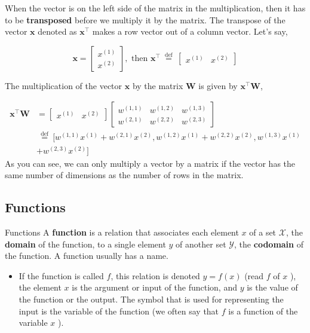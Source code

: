 \documentclass[9pt,dvipsnames]{beamer}
\begin{document}
\begin{frame}
	 When the vector is on the left side of the matrix in the multiplication, then it has to be \textbf{transposed} before we multiply it by the matrix. The transpose of the vector $\mathbf{x}$ denoted as $\mathbf{x}^{\top}$ makes a row vector out of a column vector. Let's say,
	
	$$
	\mathbf{x}=\left[\begin{array}{l}
		x^{(1)} \\
		x^{(2)}
	\end{array}\right], \text { then } \mathbf{x}^{\top} \stackrel{\text { def }}{=}\left[\begin{array}{ll}
		x^{(1)} & x^{(2)}
	\end{array}\right]
	$$
	
	The multiplication of the vector $\mathbf{x}$ by the matrix $\mathbf{W}$ is given by $\mathbf{x}^{\top} \mathbf{W}$,
	
	\begin{equation*}
			\begin{aligned}
			\mathbf{x}^{\top} \mathbf{W} & =\left[\begin{array}{ll}
				x^{(1)} & x^{(2)}
			\end{array}\right]\left[\begin{array}{lll}
				w^{(1,1)} & w^{(1,2)} & w^{(1,3)} \\
				w^{(2,1)} & w^{(2,2)} & w^{(2,3)}
			\end{array}\right] \\
			& \stackrel{\text { def }}{=}[w^{(1,1)} x^{(1)}+w^{(2,1)} x^{(2)}, w^{(1,2)} x^{(1)}+w^{(2,2)} x^{(2)}, w^{(1,3)} x^{(1)} \\
			& +w^{(2,3)} x^{(2)}]
		\end{aligned}
	\end{equation*}
	As you can see, we can only multiply a vector by a matrix if the vector has the same number of dimensions as the number of rows in the matrix.
\end{frame}

\subsection{Functions}
\begin{frame}{Functions}
	A \textbf{function} is a relation that associates each element $x$ of a set $\mathcal{X}$, the \textbf{domain} of the function, to a single element $y$ of another set $\mathcal{Y}$, the \textbf{codomain} of the function. A function usually has a name. 
	\begin{itemize}
		\item 	If the function is called $f$, this relation is denoted $y=f(x)$ (read $f$ of $x$ ), the element $x$ is the argument or input of the function, and $y$ is the value of the function or the output. The symbol that is used for representing the input is the variable of the function (we often say that $f$ is a function of the variable $x$ ).
	\end{itemize}
\end{frame}
\end{document}
